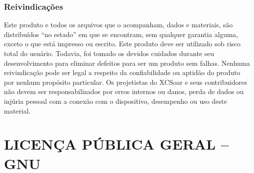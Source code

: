 \documentclass[a4paper,11pt]{refrep}
\begin{document}
\subsection*{Reivindicações}
Este produto e todos os arquivos que o acompanham, dados e materiais,
são distribuídos “no estado” em que se encontram, sem qualquer
garantia alguma, exceto o que está impresso ou escrito. Este produto
deve ser utilizado sob risco total do usuário. Todavia, foi tomado os
devidos cuidados durante seu desenvolvimento para eliminar defeitos
para ser um produto sem falhas. Nenhuma reivindicação pode ser legal
a respeito da confiabilidade ou aptidão do produto por nenhum
propósito particular. Os projetistas do XCSoar e seus contribuidores não
devem ser responsabilizados por erros internos ou danos, perda de dados
ou injúria pessoal com a conexão com o dispositivo, desempenho ou uso
deste material.
































\pagestyle{empty}\hypersetup{linkcolor=orange}
\printindex

\appendix

\chapter{LICENÇA PÚBLICA GERAL – GNU}\label{cha:gnu-general-public}


\listoftodos
\end{document}
